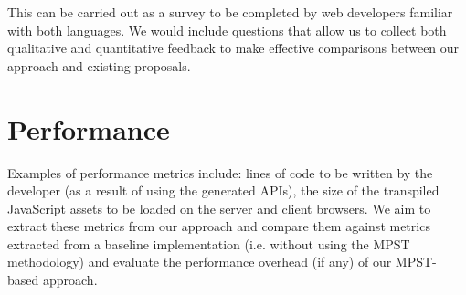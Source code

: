 \documentclass[12pt,twoside]{report}
\begin{document}
This can be carried out as a survey to be completed by web developers familiar with both languages. We would include questions that allow us to collect both qualitative and quantitative feedback to make effective comparisons between our approach and existing proposals.

\section{Performance} Examples of performance metrics include: lines of code to be written by the developer (as a result of using the generated APIs), the size of the transpiled JavaScript assets to be loaded on the server and client browsers. We aim to extract these metrics from our approach and compare them against metrics extracted from a baseline implementation (i.e. without using the MPST methodology) and evaluate the performance overhead (if any) of our MPST-based approach.

\clearpage



\end{document}
